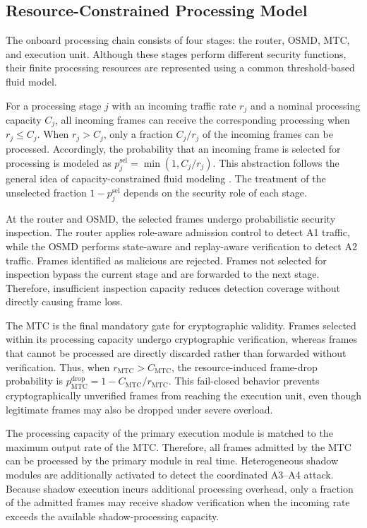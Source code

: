 \documentclass[journal]{IEEEtran}
\begin{document}
\subsection{Resource-Constrained Processing Model}

The onboard processing chain consists of four stages: the router, OSMD, MTC, and execution unit. Although these stages perform different security functions, their finite processing resources are represented using a common threshold-based fluid model.

For a processing stage $j$ with an incoming traffic rate $r_j$ and a nominal processing capacity $C_j$, all incoming frames can receive the corresponding processing when $r_j \leq C_j$. When $r_j > C_j$, only a fraction $C_j/r_j$ of the incoming frames can be processed. Accordingly, the probability that an incoming frame is selected for processing is modeled as $p_j^{\mathrm{sel}}=\min(1,C_j/r_j)$. This abstraction follows the general idea of capacity-constrained fluid modeling \cite{misra2000fluid}. The treatment of the unselected fraction $1-p_j^{\mathrm{sel}}$ depends on the security role of each stage.

At the router and OSMD, the selected frames undergo probabilistic security inspection. The router applies role-aware admission control to detect A1 traffic, while the OSMD performs state-aware and replay-aware verification to detect A2 traffic. Frames identified as malicious are rejected. Frames not selected for inspection bypass the current stage and are forwarded to the next stage. Therefore, insufficient inspection capacity reduces detection coverage without directly causing frame loss.

The MTC is the final mandatory gate for cryptographic validity. Frames selected within its processing capacity undergo cryptographic verification, whereas frames that cannot be processed are directly discarded rather than forwarded without verification. Thus, when $r_{\mathrm{MTC}}>C_{\mathrm{MTC}}$, the resource-induced frame-drop probability is $p_{\mathrm{MTC}}^{\mathrm{drop}}=1-C_{\mathrm{MTC}}/r_{\mathrm{MTC}}$. This fail-closed behavior prevents cryptographically unverified frames from reaching the execution unit, even though legitimate frames may also be dropped under severe overload.

The processing capacity of the primary execution module is matched to the maximum output rate of the MTC. Therefore, all frames admitted by the MTC can be processed by the primary module in real time. Heterogeneous shadow modules are additionally activated to detect the coordinated A3--A4 attack. Because shadow execution incurs additional processing overhead, only a fraction of the admitted frames may receive shadow verification when the incoming rate exceeds the available shadow-processing capacity.
\end{document}
